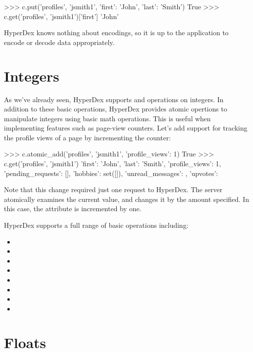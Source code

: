 \begin{pythoncode}
>>> c.put('profiles', 'jsmith1', {'first': 'John', 'last': 'Smith'})
True
>>> c.get('profiles', 'jsmith1')['first']
'John'
\end{pythoncode}

HyperDex knows nothing about encodings, so it is up to the application to encode
or decode data appropriately.

\section{Integers}
\label{sec:data-types:integers}

As we've already seen, HyperDex supports  and  operations on
integers.  In addition to these basic operations, HyperDex provides atomic
opertions to manipulate integers using basic math operations.  This is useful
when implementing features such as page-view counters.  Let's add support for
tracking the profile views of a page by incrementing the counter:

\begin{pythoncode}
>>> c.atomic_add('profiles', 'jsmith1', {'profile_views': 1})
True
>>> c.get('profiles', 'jsmith1')
{'first': 'John', 'last': 'Smith',
 'profile_views': 1,
 'pending_requests': [],
 'hobbies': set([]),
 'unread_messages': {},
 'upvotes': {}}
\end{pythoncode}

Note that this change required just one request to HyperDex.  The server
atomically examines the current value, and changes it by the amount specified.
In this case, the  attribute is incremented by one.

HyperDex supports a full range of basic operations including:
\begin{itemize}[noitemsep,nolistsep]
\item {}
\item {}
\item {}
\item {}
\item {}
\item {}
\item {}
\item {}
\end{itemize}

\section{Floats}
\label{sec:data-types:floats}

